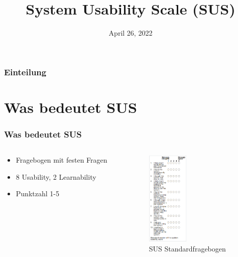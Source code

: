 \documentclass[12pt, aspectratio=169]{beamer}
\title{System Usability Scale (SUS)}
\author[Y. Höll, J. Jäpel]{}
\date{April 26, 2022}
\begin{document}
\frame{\titlepage}

\begin{frame}
	\frametitle{Einteilung}
	\tableofcontents
\end{frame}

\section{Was bedeutet SUS}
\begin{frame}
	\frametitle{Was bedeutet SUS}
	\begin{columns}
		\begin{column}{0.5\textwidth}
			\begin{itemize}
				\item<1> Fragebogen mit festen Fragen
				\item<1> 8 Usability, 2 Learnability
				\item<1> Punktzahl 1-5
			\end{itemize}
		\end{column}
		\begin{column}{0.5\textwidth}
			\begin{figure}
				\centering
				\includegraphics[keepaspectratio=true, width=75px]{./image/sus.png}
				\caption{SUS Standardfragebogen}
			\end{figure}		
		\end{column}
	\end{columns}
\end{frame}
\end{document}
